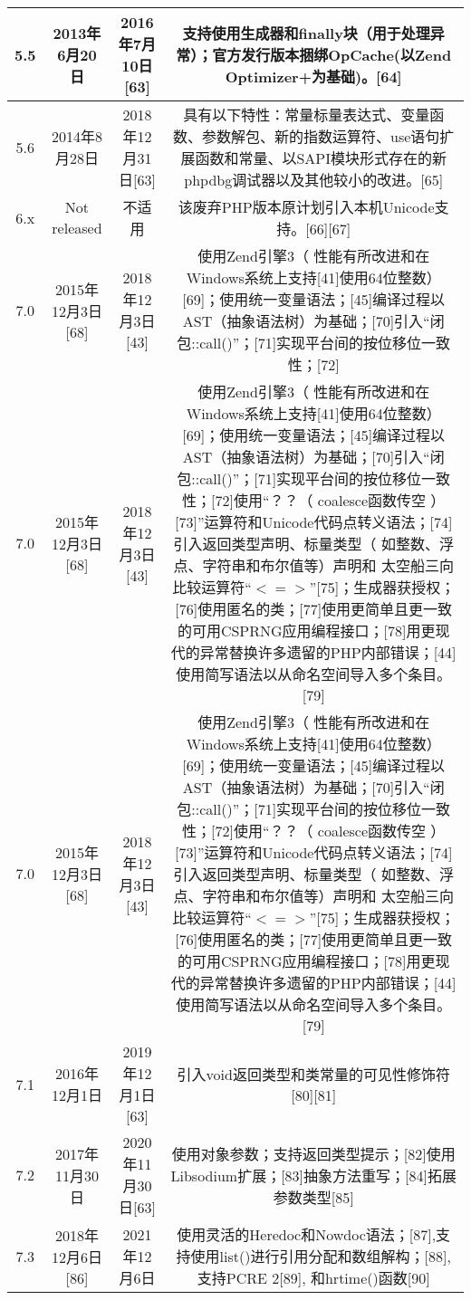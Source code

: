\begin{table}[ht]
\begin{tabular}{|c|c|c|c}
\hline
5.5 & 2013年6月20日 & 2016年7月10日[63] & 支持使用生成器和finally块（用于处理异常）；官方发行版本捆绑OpCache(以Zend Optimizer+为基础)。[64]\\
\hline
5.6 & 2014年8月28日 & 2018年12月31日[63] & 具有以下特性：常量标量表达式、变量函数、参数解包、新的指数运算符、use语句扩展函数和常量、以SAPI模块形式存在的新phpdbg调试器以及其他较小的改进。[65]\\
\hline
6.x & Not released & 不适用 & 该废弃PHP版本原计划引入本机Unicode支持。[66][67]\\
\hline
7.0 & 2015年12月3日[68] & 2018年12月3日[43] & 使用Zend引擎3（ 性能有所改进和在Windows系统上支持[41]使用64位整数）[69]；使用统一变量语法；[45]编译过程以 AST（抽象语法树）为基础；[70]引入“闭包::call()”；[71]实现平台间的按位移位一致性；[72]\\
\hline
7.0 & 2015年12月3日[68] & 2018年12月3日[43] & 使用Zend引擎3（ 性能有所改进和在Windows系统上支持[41]使用64位整数）[69]；使用统一变量语法；[45]编译过程以 AST（抽象语法树）为基础；[70]引入“闭包::call()”；[71]实现平台间的按位移位一致性；[72]使用“？？（ coalesce函数传空 ）[73]”运算符和Unicode代码点转义语法；[74]引入返回类型声明、标量类型（ 如整数、浮点、字符串和布尔值等）声明和 太空船三向比较运算符“$< = >$”[75]；生成器获授权；[76]使用匿名的类；[77]使用更简单且更一致的可用CSPRNG应用编程接口；[78]用更现代的异常替换许多遗留的PHP内部错误；[44]使用简写语法以从命名空间导入多个条目。[79]\\
\hline
7.0 & 2015年12月3日[68] & 2018年12月3日[43] & 使用Zend引擎3（ 性能有所改进和在Windows系统上支持[41]使用64位整数）[69]；使用统一变量语法；[45]编译过程以 AST（抽象语法树）为基础；[70]引入“闭包::call()”；[71]实现平台间的按位移位一致性；[72]使用“？？（ coalesce函数传空 ）[73]”运算符和Unicode代码点转义语法；[74]引入返回类型声明、标量类型（ 如整数、浮点、字符串和布尔值等）声明和 太空船三向比较运算符“$< = >$”[75]；生成器获授权；[76]使用匿名的类；[77]使用更简单且更一致的可用CSPRNG应用编程接口；[78]用更现代的异常替换许多遗留的PHP内部错误；[44]使用简写语法以从命名空间导入多个条目。[79]\\
\hline
7.1 & 2016年12月1日 & 2019年12月1日[63] & 引入void返回类型和类常量的可见性修饰符[80][81]\\
\hline
7.2 & 2017年11月30日 & 2020年11月30日[63] & 使用对象参数；支持返回类型提示；[82]使用Libsodium扩展；[83]抽象方法重写；[84]拓展参数类型[85]\\
\hline
7.3 & 2018年12月6日[86] & 2021年12月6日 & 使用灵活的Heredoc和Nowdoc语法；[87],支持使用list()进行引用分配和数组解构；[88],支持PCRE 2[89], 和hrtime()函数[90]\\

\end{tabular}
\end{table}
